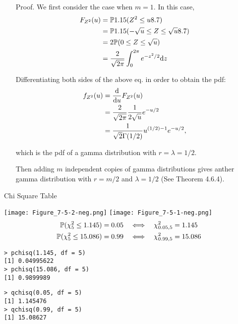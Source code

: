 \begin{frame}[fragile]
	\begin{enumerate}
		\item[Proof.] We first consider the case when $m=1$. In this case,
			\begin{align*}
				F_{Z^2}(u) & = \mathbb{P}1.15(Z^2\le u8.7)                     \\
                   & = \mathbb{P}1.15( -\sqrt{u}\le Z \le \sqrt{u}8.7) \\
                   & = 2 \mathbb{P}(0\le Z\le \sqrt{u})                    \\
                   & = \frac{2}{\sqrt{2\pi}} \int_0^{2\pi} e^{-z^2/2} \mathrm{d} z
			\end{align*}
		\item[] Differentiating both sides of the above eq. in order to obtain the pdf:
			\begin{align*}
				f_{Z^2}(u) & = \frac{\mathrm{d}}{\mathrm{d} u} F_{Z^2}(u)                       \\
                   & = \frac{2}{\sqrt{2\pi}} \frac{1}{2\sqrt{u}} e^{-u/2} \\
                   & = \frac{1}{\sqrt{2} \Gamma(1/2)} u^{(1/2)-1} e^{-u/2},
			\end{align*}
		\item[] which is the pdf of a gamma distribution with $r=\lambda=1/2$.
		\item[] Then adding $m$ independent copies of gamma distributions gives anther gamma
			distribution with $r=m/2$ and $\lambda=1/2$ (See Theorem 4.6.4). \myEnd
	\end{enumerate}
\end{frame}
\begin{frame}[fragile]{Chi Square Table}
\begin{center}
\texttt{[image: Figure\_7-5-2-neg.png]}
\texttt{[image: Figure\_7-5-1-neg.png]}
\begin{align*}
	\mathbb{P}(\chi_5^2\le 1.145) = 0.05 & \quad \Longleftrightarrow  \quad \chi_{0.05,5}^2 =1.145 \\
	\mathbb{P}(\chi_5^2\le 15.086)=0.99  & \quad \Longleftrightarrow  \quad \chi_{0.99,5}^2 =15.086
\end{align*}
\begin{minipage}{0.3\textwidth}
\begin{lstlisting}
> pchisq(1.145, df = 5)
[1] 0.04995622
> pchisq(15.086, df = 5)
[1] 0.9899989
\end{lstlisting}
\end{minipage}
\qquad\qquad
\begin{minipage}{0.3\textwidth}
\begin{lstlisting}
> qchisq(0.05, df = 5)
[1] 1.145476
> qchisq(0.99, df = 5)
[1] 15.08627
\end{lstlisting}
\end{minipage}
\end{center}
\end{frame}
